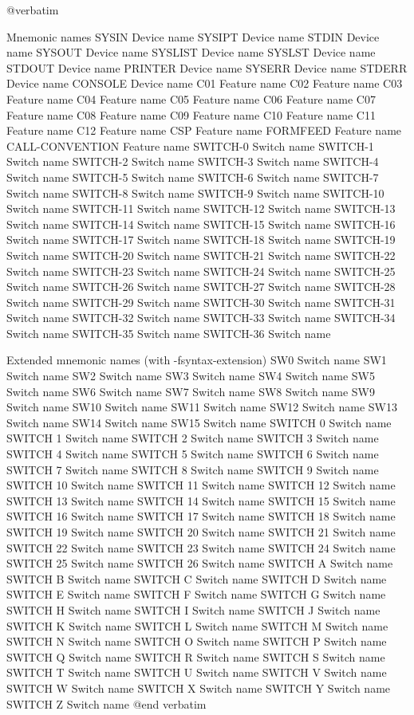 @verbatim

Mnemonic names
SYSIN		Device name
SYSIPT		Device name
STDIN		Device name
SYSOUT		Device name
SYSLIST		Device name
SYSLST		Device name
STDOUT		Device name
PRINTER		Device name
SYSERR		Device name
STDERR		Device name
CONSOLE		Device name
C01		Feature name
C02		Feature name
C03		Feature name
C04		Feature name
C05		Feature name
C06		Feature name
C07		Feature name
C08		Feature name
C09		Feature name
C10		Feature name
C11		Feature name
C12		Feature name
CSP		Feature name
FORMFEED	Feature name
CALL-CONVENTION	Feature name
SWITCH-0	Switch name
SWITCH-1	Switch name
SWITCH-2	Switch name
SWITCH-3	Switch name
SWITCH-4	Switch name
SWITCH-5	Switch name
SWITCH-6	Switch name
SWITCH-7	Switch name
SWITCH-8	Switch name
SWITCH-9	Switch name
SWITCH-10	Switch name
SWITCH-11	Switch name
SWITCH-12	Switch name
SWITCH-13	Switch name
SWITCH-14	Switch name
SWITCH-15	Switch name
SWITCH-16	Switch name
SWITCH-17	Switch name
SWITCH-18	Switch name
SWITCH-19	Switch name
SWITCH-20	Switch name
SWITCH-21	Switch name
SWITCH-22	Switch name
SWITCH-23	Switch name
SWITCH-24	Switch name
SWITCH-25	Switch name
SWITCH-26	Switch name
SWITCH-27	Switch name
SWITCH-28	Switch name
SWITCH-29	Switch name
SWITCH-30	Switch name
SWITCH-31	Switch name
SWITCH-32	Switch name
SWITCH-33	Switch name
SWITCH-34	Switch name
SWITCH-35	Switch name
SWITCH-36	Switch name

Extended mnemonic names (with -fsyntax-extension)
SW0		Switch name
SW1		Switch name
SW2		Switch name
SW3		Switch name
SW4		Switch name
SW5		Switch name
SW6		Switch name
SW7		Switch name
SW8		Switch name
SW9		Switch name
SW10		Switch name
SW11		Switch name
SW12		Switch name
SW13		Switch name
SW14		Switch name
SW15		Switch name
SWITCH 0	Switch name
SWITCH 1	Switch name
SWITCH 2	Switch name
SWITCH 3	Switch name
SWITCH 4	Switch name
SWITCH 5	Switch name
SWITCH 6	Switch name
SWITCH 7	Switch name
SWITCH 8	Switch name
SWITCH 9	Switch name
SWITCH 10	Switch name
SWITCH 11	Switch name
SWITCH 12	Switch name
SWITCH 13	Switch name
SWITCH 14	Switch name
SWITCH 15	Switch name
SWITCH 16	Switch name
SWITCH 17	Switch name
SWITCH 18	Switch name
SWITCH 19	Switch name
SWITCH 20	Switch name
SWITCH 21	Switch name
SWITCH 22	Switch name
SWITCH 23	Switch name
SWITCH 24	Switch name
SWITCH 25	Switch name
SWITCH 26	Switch name
SWITCH A	Switch name
SWITCH B	Switch name
SWITCH C	Switch name
SWITCH D	Switch name
SWITCH E	Switch name
SWITCH F	Switch name
SWITCH G	Switch name
SWITCH H	Switch name
SWITCH I	Switch name
SWITCH J	Switch name
SWITCH K	Switch name
SWITCH L	Switch name
SWITCH M	Switch name
SWITCH N	Switch name
SWITCH O	Switch name
SWITCH P	Switch name
SWITCH Q	Switch name
SWITCH R	Switch name
SWITCH S	Switch name
SWITCH T	Switch name
SWITCH U	Switch name
SWITCH V	Switch name
SWITCH W	Switch name
SWITCH X	Switch name
SWITCH Y	Switch name
SWITCH Z	Switch name
@end verbatim

